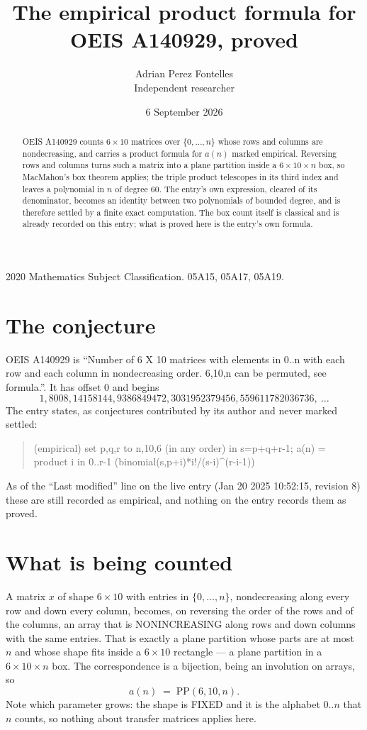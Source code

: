 \documentclass[11pt,a4paper]{article}
\title{The empirical product formula for OEIS A140929, proved}
\author{Adrian Perez Fontelles\\ \small Independent researcher}
\date{6 September 2026}
\theoremstyle{plain}
\theoremstyle{definition}
\begin{document}
\maketitle

\begin{abstract}
OEIS A140929 counts $6\times10$ matrices over $\{0,\dots,n\}$ whose rows and columns are
nondecreasing, and carries a product formula for $a(n)$ marked empirical. Reversing rows and
columns turns such a matrix into a plane partition inside a $6\times10\times n$ box, so
MacMahon's box theorem applies; the triple product telescopes in its third index and leaves a
polynomial in $n$ of degree $60$. The entry's own expression, cleared of its denominator,
becomes an identity between two polynomials of bounded degree, and is therefore settled by a
finite exact computation. The box count itself is classical and is already recorded on this
entry; what is proved here is the entry's own formula.
\end{abstract}

\noindent\small 2020 Mathematics Subject Classification. 05A15, 05A17, 05A19.\normalsize

\section{The conjecture}

OEIS A140929 is ``Number of 6 X 10 matrices with elements in 0..n with each row and each column in nondecreasing order. 6,10,n can be permuted, see formula.''. It has offset $0$ and begins
\[
1, 8008, 14158144, 9386849472, 3031952379456, 559611782036736,\ \dots
\]
The entry states, as conjectures contributed by its author and never marked settled:
\begin{quote}
(empirical) set p,q,r to n,10,6 (in any order) in s=p+q+r-1; a(n) = product {i in 0..r-1} (binomial(s,p+i)*i!/(s-i)\^{}(r-i-1))

\end{quote}
As of the ``Last modified'' line on the live entry (Jan 20 2025 10:52:15, revision 8) these are still
recorded as empirical, and nothing on the entry records them as proved.

\section{What is being counted}

A matrix $x$ of shape $6\times10$ with entries in $\{0,\dots,n\}$, nondecreasing along
every row and down every column, becomes, on reversing the order of the rows and of the
columns, an array that is NONINCREASING along rows and down columns with the same entries. That
is exactly a plane partition whose parts are at most $n$ and whose shape fits inside a
$6\times10$ rectangle --- a plane partition in a $6\times10\times n$ box. The
correspondence is a bijection, being an involution on arrays, so
\[
a(n)\;=\;\mathrm{PP}(6,10,n).
\]
Note which parameter grows: the shape is FIXED and it is the alphabet $0..n$ that $n$ counts,
so nothing about transfer matrices applies here.
\end{document}
